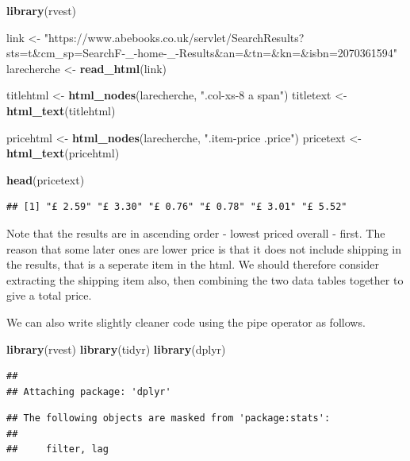 \documentclass[]{book}
\newenvironment{Shaded}{\begin{snugshade}}{\end{snugshade}}
\newcommand{\KeywordTok}[1]{\textcolor[rgb]{0.13,0.29,0.53}{\textbf{#1}}}
\newcommand{\StringTok}[1]{\textcolor[rgb]{0.31,0.60,0.02}{#1}}
\newcommand{\NormalTok}[1]{#1}
\theoremstyle{definition}
\theoremstyle{definition}
\theoremstyle{definition}
\theoremstyle{remark}
\begin{document}
\begin{Shaded}
\begin{Highlighting}[]
\KeywordTok{library}\NormalTok{(rvest)}

\NormalTok{link <-}\StringTok{ "https://www.abebooks.co.uk/servlet/SearchResults?sts=t&cm_sp=SearchF-_-home-_-Results&an=&tn=&kn=&isbn=2070361594"}
\NormalTok{larecherche <-}\StringTok{ }\KeywordTok{read_html}\NormalTok{(link)}

\NormalTok{titlehtml <-}\StringTok{ }\KeywordTok{html_nodes}\NormalTok{(larecherche, }\StringTok{".col-xs-8 a span"}\NormalTok{)}
\NormalTok{titletext <-}\StringTok{ }\KeywordTok{html_text}\NormalTok{(titlehtml)}

\NormalTok{pricehtml <-}\StringTok{ }\KeywordTok{html_nodes}\NormalTok{(larecherche, }\StringTok{".item-price .price"}\NormalTok{)}
\NormalTok{pricetext <-}\StringTok{ }\KeywordTok{html_text}\NormalTok{(pricehtml)}

\KeywordTok{head}\NormalTok{(pricetext)}
\end{Highlighting}
\end{Shaded}

\begin{verbatim}
## [1] "£ 2.59" "£ 3.30" "£ 0.76" "£ 0.78" "£ 3.01" "£ 5.52"
\end{verbatim}

Note that the results are in ascending order - lowest priced overall -
first. The reason that some later ones are lower price is that it does
not include shipping in the results, that is a seperate item in the
html. We should therefore consider extracting the shipping item also,
then combining the two data tables together to give a total price.

We can also write slightly cleaner code using the pipe operator as
follows.

\begin{Shaded}
\begin{Highlighting}[]
\KeywordTok{library}\NormalTok{(rvest)}
\KeywordTok{library}\NormalTok{(tidyr)}
\KeywordTok{library}\NormalTok{(dplyr)}
\end{Highlighting}
\end{Shaded}

\begin{verbatim}
## 
## Attaching package: 'dplyr'
\end{verbatim}

\begin{verbatim}
## The following objects are masked from 'package:stats':
## 
##     filter, lag
\end{verbatim}
\end{document}
